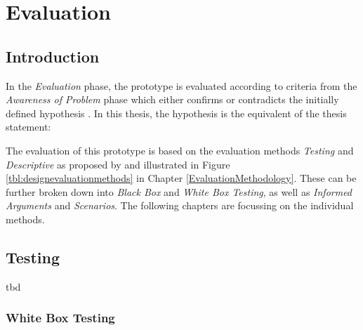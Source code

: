 
\chapter{Evaluation}

\label{ChapterEvaluation}


\section{Introduction}

In the \textit{Evaluation} phase, the prototype is evaluated according to criteria from the \textit{Awareness of Problem} phase which either confirms or contradicts the initially defined hypothesis \citep{Vaishnavi2008}. In this thesis, the hypothesis is the equivalent of the thesis statement:
\begin{framed}
	\textit{\thesisstatementtext}
\end{framed}
The evaluation of this prototype is based on the evaluation methods \textit{Testing} and \textit{Descriptive} as proposed by \cite{Hevner2004} and illustrated in Figure \ref{tbl:designevaluationmethods} in Chapter \ref{EvaluationMethodology}. These can be further broken down into \textit{Black Box} and \textit{White Box Testing}, as well as \textit{Informed Arguments} and \textit{Scenarios}. The following chapters are focussing on the individual methods.



\section{Testing}

tbd


\subsection{White Box Testing}

